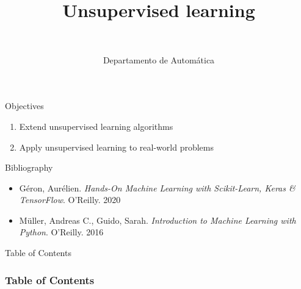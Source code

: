 \documentclass[10pt,compress]{beamer} %
\title[Unsupervised learning]{Unsupervised learning}
\author{\asignatura\\\carrera}
\institute{}
\date{Departamento de Automática}
\begin{document}
{\titlepageBlue
    \begin{frame}
        \titlepage
    \end{frame}
}

\institute{\asignatura}

\begin{frame}[plain]{}
   \begin{block}{Objectives}
      \begin{enumerate}
         \item Extend unsupervised learning algorithms
         \item Apply unsupervised learning to real-world problems
      \end{enumerate} 
   \end{block}

   \begin{block}{Bibliography}
	\begin{itemize}
        \item G\'eron, Aur\'elien. \textit{Hands-On Machine Learning with Scikit-Learn, Keras \& TensorFlow}. O'Reilly. 2020
        \item M\"uller, Andreas C., Guido, Sarah. \textit{Introduction to Machine Learning with Python}. O'Reilly. 2016
	\end{itemize}
   \end{block}
\end{frame}

{
\begin{frame}[shrink]{Table of Contents}

 	\frametitle{Table of Contents}
  	\begin{multicols}{2}
  		\tableofcontents
    \end{multicols}

\end{frame}
}

\end{document}

